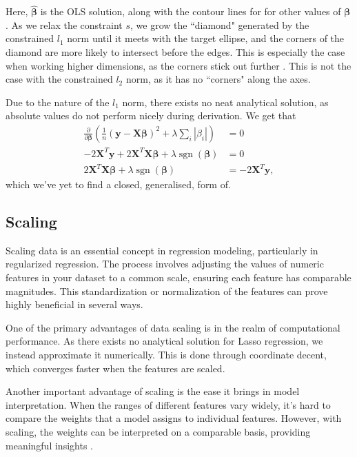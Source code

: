 \documentclass{article}
\DeclareMathOperator*{\sgn}{sgn}
\begin{document}
Here, $\boldsymbol{\hat{\beta}}$ is the OLS solution, along with the contour lines for for other values of $\boldsymbol{\beta}$. As we relax the constraint $s$, we grow the ``diamond" generated by the constrained $l_1$ norm until it meets with the target ellipse, and the corners of the diamond are more likely to intersect before the edges. This is especially the case when working higher dimensions, as the corners stick out further \cite{Murphy2012}. This is not the case with the constrained $l_2$ norm, as it has no ``corners" along the axes.

Due to the nature of the $l_1$ norm, there exists no neat analytical solution, as absolute values do not perform nicely during derivation. We get that
\begin{align*}
    \frac{\partial}{\partial \boldsymbol{\beta}} \left( \frac{1}{n} \left( \boldsymbol{y} - \boldsymbol{X\beta} \right)^2 + \lambda \sum_i |\beta_i| \right) &= 0 \\
    -2 \boldsymbol{X}^T \boldsymbol{y} + 2 \boldsymbol{X}^T \boldsymbol{X\beta} + \lambda \sgn(\boldsymbol{\beta}) &= 0 \\
    2 \boldsymbol{X}^T \boldsymbol{X\beta} + \lambda \sgn(\boldsymbol{\beta}) &= -2 \boldsymbol{X}^T \boldsymbol{y},
\end{align*}
which we've yet to find a closed, generalised, form of.

\subsection{Scaling}
Scaling data is an essential concept in regression modeling, particularly in regularized regression. The process involves adjusting the values of numeric features in your dataset to a common scale, ensuring each feature has comparable magnitudes.
This standardization or normalization of the features can prove highly beneficial in several ways.

One of the primary advantages of data scaling is in the realm of computational performance. As there exists no analytical solution for Lasso regression, we instead approximate it numerically. This is done through coordinate decent, which converges faster when the features are scaled.

Another important advantage of scaling is the ease it brings in model interpretation. When the ranges of different features vary widely, it's hard to compare the weights that a model assigns to individual features. However, with scaling, the weights can be interpreted on a comparable basis, providing meaningful insights \cite{james2021introduction}.
\end{document}
